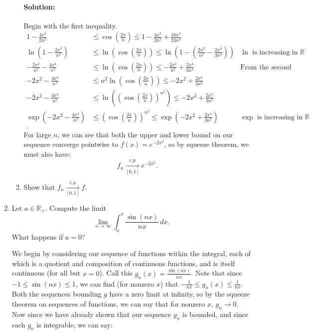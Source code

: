 \documentclass{article}
\begin{document}
\begin{enumerate}
\begin{enumerate}
        \paragraph{Solution: }Begin with the first inequality. 
        \begin{align*}
            1-\frac{4x^2}{2n^2}&\leq \cos \left(   \frac{2x}{n}\right)\leq 1-\frac{4x^2}{2n^2}+\frac{16x^4}{24n^{4}}\\
            \ln\left(  1-\frac{2x^2}{n^2}\right) &\leq\ln \left(  \cos \left(   \frac{2x}{n}\right)\right) \leq\ln\left( 1-\left( \frac{2x^2}{n^2}-\frac{2 x^4}{3n^{4}}\right)  \right) &\ln\text{ is increasing in }\mathbb{R}\\
            -\frac{2x^2}{n^2}-\frac{4x^4}{n^4}&\leq \ln \left(  \cos \left(   \frac{2x}{n}\right)\right)\leq-\frac{2x^2}{n^2}+\frac{2x^4}{3n^{4}}&\text{From the second inequality}\\
            -{2x^2}-\frac{4x^4}{n^2}&\leq n^2 \ln \left(  \cos \left(   \frac{2x}{n}\right)\right)\leq{-2x^2}+\frac{2x^4}{3n^{2}}\\
            -{2x^2}-\frac{4x^4}{n^2}&\leq \ln \left( \left( \cos \left(   \frac{2x}{n}\right)\right)^{n^2}\right)\leq{-2x^2}+\frac{2x^4}{3n^{2}}\\
            \exp\left( -{2x^2}-\frac{4x^4}{n^2} \right) &\leq \left( \cos \left(   \frac{2x}{n}\right)\right)^{n^2}\leq\exp\left( -{2x^2}+\frac{2x^4}{3n^{2}} \right) &\exp\text{ is increasing in }\mathbb{R}\\
        .\end{align*}
        For large $n$, we can see that both the upper and lower bound on our sequence converge pointwise to $f(x)=e^{-2x^2}$, so by squeeze theorem, we must also have:
        \[ f_n\xrightarrow[{[0,1]}]{c.p}e^{-2x^2} .\] 
    \item Show that $f_n\xrightarrow[{[0,1]}]{c.u}f$.

  \end{enumerate}

\item Let $a\in \mathbb{R}_{+}$. Compute the limit
  \[
  \lim_{n \to \infty} \int_{a}^{\pi} \frac{\sin(nx)}{nx} \, d x 
  .\] 
  What happens if $a=0$?

  We begin by considering our sequence of functions within the integral, each of which is a quotient and composition of continuous functions, and is itself continuous (for all but $x=0$). Call this $g_n(x) =\frac{\sin(nx)}{nx}$. Note that since $-1\leq\sin(nx)\leq 1$, we can find (for nonzero $x$) that $-\frac{1}{nx}\leq g_n(x)\leq \frac{1}{nx}$. Both the sequences bounding $g$ have a zero limit at infinity, so by the squeeze theorem on sequences of functions, we can say that for nonzero $x$, $g_n\to 0$.
  Now since we have already shown that our sequence $g_n$ is bounded, and since each $g_n$ is integrable, we can say:


\end{enumerate}
\end{document}
